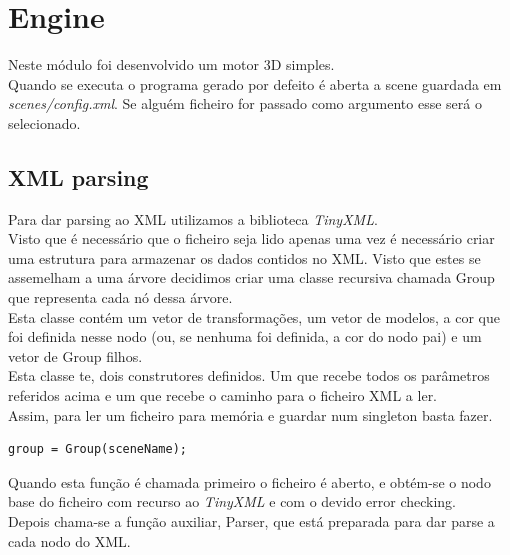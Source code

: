 \documentclass[a4paper]{report}
\begin{document}
\chapter{Engine}
Neste módulo foi desenvolvido um motor 3D simples.\\
Quando se executa o programa gerado por defeito é aberta a scene guardada em
\textit{scenes/config.xml}. Se alguém ficheiro for passado como argumento esse
será o selecionado.\\

\section{XML parsing}
Para dar parsing ao XML utilizamos a biblioteca \textit{TinyXML}.\\
Visto que é necessário que o ficheiro seja lido apenas uma vez é necessário
criar uma estrutura para armazenar os dados contidos no XML. Visto que estes se
assemelham a uma árvore decidimos criar uma classe recursiva chamada Group que
representa cada nó dessa árvore.\\
Esta classe contém um vetor de transformações, um vetor de modelos, a cor que
foi definida nesse nodo (ou, se nenhuma foi definida, a cor do nodo pai) e um
vetor de Group filhos.\\
Esta classe te, dois construtores definidos. Um que recebe todos os parâmetros
referidos acima e um que recebe o caminho para o ficheiro XML a ler.\\
Assim, para ler um ficheiro para memória e guardar num singleton basta fazer.

\begin{lstlisting}
group = Group(sceneName);
\end{lstlisting}
Quando esta função é chamada primeiro o ficheiro é aberto, e obtém-se o nodo
base do ficheiro com recurso ao \textit{TinyXML} e com o devido error
checking.\\
Depois chama-se a função auxiliar, Parser, que está preparada para dar parse a
cada nodo do XML.
\end{document}
